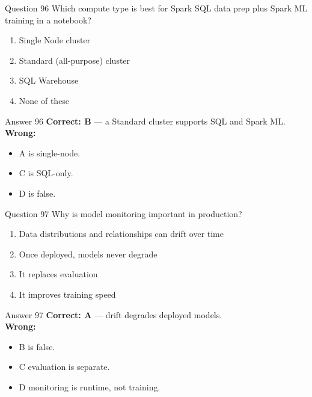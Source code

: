 \documentclass[aspectratio=169,11pt]{beamer}
\begin{document}
	\begin{frame}{Question 96}
		Which compute type is best for Spark SQL data prep plus Spark ML training in a notebook?
		\begin{enumerate}[label=\Alph*.]
			\item Single Node cluster
			\item Standard (all-purpose) cluster
			\item SQL Warehouse
			\item None of these
		\end{enumerate}
	\end{frame}
	\begin{frame}{Answer 96}
		\textbf{Correct: B} --- a Standard cluster supports SQL and Spark ML.\\
		\vspace{0.5em}
		\textbf{Wrong:}
		\begin{itemize}
			\item A is single-node.
			\item C is SQL-only.
			\item D is false.
		\end{itemize}
	\end{frame}
	
	\begin{frame}{Question 97}
		Why is model monitoring important in production?
		\begin{enumerate}[label=\Alph*.]
			\item Data distributions and relationships can drift over time
			\item Once deployed, models never degrade
			\item It replaces evaluation
			\item It improves training speed
		\end{enumerate}
	\end{frame}
	\begin{frame}{Answer 97}
		\textbf{Correct: A} --- drift degrades deployed models.\\
		\vspace{0.5em}
		\textbf{Wrong:}
		\begin{itemize}
			\item B is false.
			\item C evaluation is separate.
			\item D monitoring is runtime, not training.
		\end{itemize}
	\end{frame}
	
\end{document}
